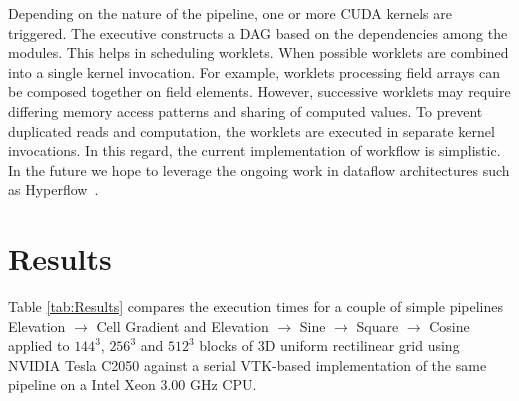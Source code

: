 \documentclass{vgtc}                          %
\newcommand*{\lcite}[1]{~\cite{#1}}
\begin{document}
Depending on the nature of the pipeline, one or more CUDA kernels are triggered.
The executive constructs a DAG based on the dependencies among the modules. This
helps in scheduling worklets.  When possible worklets are combined into a
single kernel invocation.  For example, worklets processing field arrays
can be composed together on field elements.  However, successive worklets may
require differing memory access patterns and sharing of computed values.
To prevent duplicated reads and computation, the worklets are executed in
separate kernel invocations.  In this regard, the current implementation of
workflow is simplistic.  In the future we hope to leverage the ongoing work
in dataflow architectures such as Hyperflow\lcite{VoPhD}.


\section{Results}
\label{sec:Results}

Table \ref{tab:Results} compares the execution times for a couple of simple
pipelines Elevation $\rightarrow$ Cell Gradient and Elevation $\rightarrow$
Sine $\rightarrow$ Square $\rightarrow$ Cosine applied to $144^3$, $256^3$
and $512^3$ blocks of 3D uniform
rectilinear grid using NVIDIA Tesla C2050 against a serial VTK-based
implementation of the same pipeline on a Intel Xeon 3.00 GHz CPU.
\end{document}
